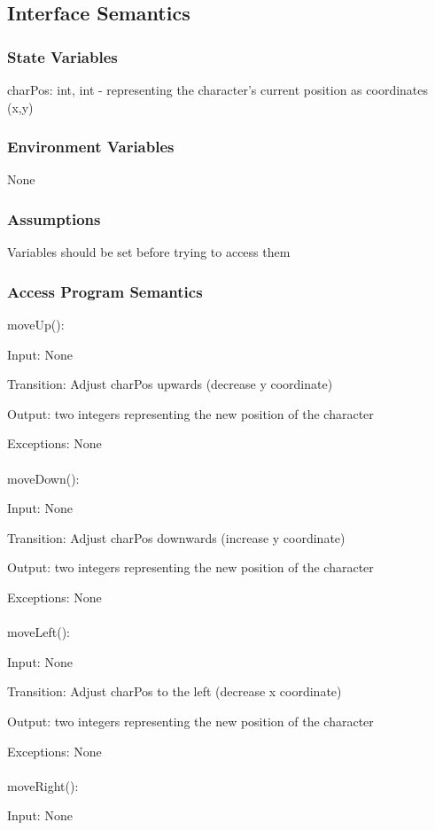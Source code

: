 \documentclass[12pt, titlepage]{article}
\begin{document}
		\subsection{Interface Semantics}
		\subsubsection{State Variables}
		charPos: int, int - representing the character's current position as coordinates (x,y)
		\subsubsection{Environment Variables}
		None
		\subsubsection{Assumptions}
		Variables should be set before trying to access them
		
		\subsubsection{Access Program Semantics}
		moveUp():
		
		Input: None
		
		Transition: Adjust charPos upwards (decrease y coordinate) 
		
		Output: two integers representing the new position of the character
		
		Exceptions: None\\
		\\
		moveDown():
		
		Input: None
		
		Transition: Adjust charPos downwards (increase y coordinate)
		
		Output: two integers representing the new position of the character
		
		Exceptions: None\\
		\\
		moveLeft():
		
		Input: None
		
		Transition: Adjust charPos to the left (decrease x coordinate)
		
		Output: two integers representing the new position of the character
		
		Exceptions: None\\
		\\
		moveRight():
		
		Input: None
		
\end{document}
